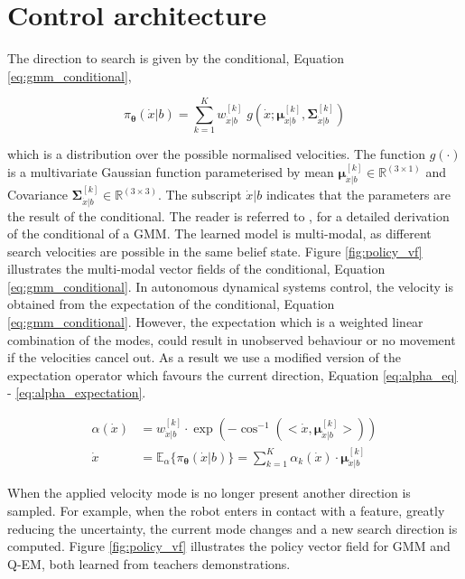 \documentclass[final,3p,times,twocolumn]{elsarticle}
\newcommand{\SigK}{\boldsymbol{\Sigma}^{[k]}}
\newcommand{\MuK}{\boldsymbol{\mu}^{[k]}}
\newcommand{\xb}{\dot{x}|b}
\newcommand{\Param}{\boldsymbol{\theta}}
\begin{document}
\section{Control architecture}\label{ch4:control_architecture}

The direction to search is given by the conditional, Equation \ref{eq:gmm_conditional},

\begin{equation}\label{eq:gmm_conditional}
 \pi_{\Param}(\dot{x}|b) = \sum_{k=1}^{K} w^{[k]}_{\xb} \; g(\dot{x};\MuK_{\xb},\SigK_{\xb}) 
 \end{equation}

which is a distribution over the possible normalised velocities. The function $g(\cdot)$ is a multivariate
Gaussian function parameterised by mean $\MuK_{\xb} \in \mathbb{R}^{(3\times1)}$ and Covariance $\SigK_{\xb} \in \mathbb{R}^{(3\times3)}$. The subscript $\xb$ indicates that the parameters 
are the result of the conditional. The reader is referred to \cite{gesture_calinon_2010}, \cite{gmr_2004} for 
a detailed derivation of the conditional of a GMM. The learned model 
is multi-modal, as different search velocities are possible 
in the same belief state. Figure \ref{fig:policy_vf} illustrates the multi-modal 
vector fields of the conditional, Equation \ref{eq:gmm_conditional}.
In autonomous dynamical systems control, the velocity is obtained from 
the expectation of the conditional, Equation \ref{eq:gmm_conditional}. However, the expectation which is a weighted 
linear combination of the modes, could result in unobserved behaviour or no movement if the velocities cancel out. 
As a result we use a modified version of the expectation operator which favours the current
direction, Equation \ref{eq:alpha_eq} - \ref{eq:alpha_expectation}.

\begin{align}
 \alpha(\dot{x}) &= w^{[k]}_{\xb} \cdot \exp(-\cos^{-1}(<\dot{x},\MuK_{\xb}>)) \label{eq:alpha_eq}\\
 \dot{x} &= \mathbb{E}_{\alpha}\{\pi_{\Param}(\dot{x}|b)\} = \sum_{k=1}^K \alpha_k(\dot{x}) \cdot \MuK_{\xb} \label{eq:alpha_expectation}
\end{align}

When the applied velocity mode is no longer present another direction is sampled. For example, when the robot enters in contact 
with a feature, greatly reducing the uncertainty, the current mode changes and a new search direction is computed. 
Figure \ref{fig:policy_vf} illustrates the policy vector field for GMM and Q-EM, both learned from teachers demonstrations.
\end{document}
